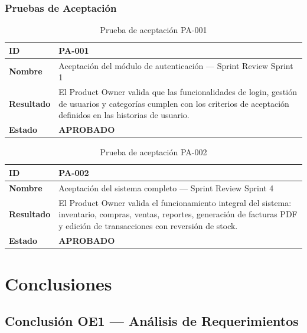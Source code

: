 \documentclass[12pt, letterpaper]{report}
\begin{document}
\subsection{Pruebas de Aceptación}

\begin{table}[H]
\centering
\caption{Prueba de aceptación PA-001}
\renewcommand{\arraystretch}{1.3}
\begin{tabularx}{\textwidth}{|l|X|}
\hline
\textbf{ID} & PA-001 \\ \hline
\textbf{Nombre} & Aceptación del módulo de autenticación --- Sprint Review Sprint 1 \\ \hline
\textbf{Resultado} & El Product Owner valida que las funcionalidades de login, gestión de usuarios y categorías cumplen con los criterios de aceptación definidos en las historias de usuario. \\ \hline
\textbf{Estado} & \textbf{APROBADO} \\ \hline
\end{tabularx}
\end{table}

\begin{table}[H]
\centering
\caption{Prueba de aceptación PA-002}
\renewcommand{\arraystretch}{1.3}
\begin{tabularx}{\textwidth}{|l|X|}
\hline
\textbf{ID} & PA-002 \\ \hline
\textbf{Nombre} & Aceptación del sistema completo --- Sprint Review Sprint 4 \\ \hline
\textbf{Resultado} & El Product Owner valida el funcionamiento integral del sistema: inventario, compras, ventas, reportes, generación de facturas PDF y edición de transacciones con reversión de stock. \\ \hline
\textbf{Estado} & \textbf{APROBADO} \\ \hline
\end{tabularx}
\end{table}


\chapter{Conclusiones}

\section{Conclusión OE1 --- Análisis de Requerimientos}
\end{document}
